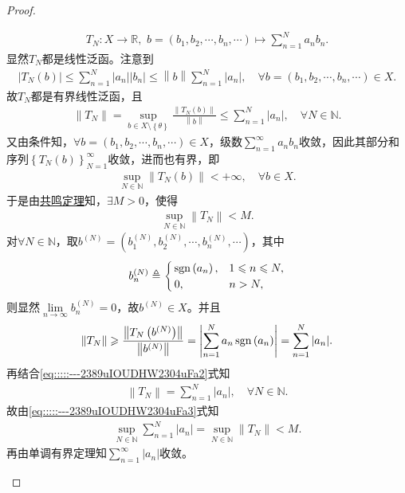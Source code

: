 \documentclass[../../main.tex]{subfiles}%
\begin{document}
\begin{proof}
\begin{enumerate}[(1)]
\begin{align*}
T_N:X\rightarrow \mathbb{R} ,\,\,b=\left( b_1,b_2,\cdots ,b_n,\cdots \right) \mapsto \sum\limits_{n=1}^N{a_n b_n}.
\end{align*}
显然$T_N$都是线性泛函。注意到
\begin{align*}
\left| T_N\left( b \right) \right|\leqslant \sum\limits_{n=1}^N{\left| a_n \right|\left| b_n \right|}\leqslant \left\| b \right\| \sum\limits_{n=1}^N{\left| a_n \right|},\quad \forall b=\left( b_1,b_2,\cdots ,b_n,\cdots \right) \in X.
\end{align*}
故$T_N$都是有界线性泛函，且
\begin{align}
\left\| T_N \right\| =\sup\limits_{b\in X\setminus \left\{ \theta \right\}}\frac{\left\| T_N\left( b \right) \right\|}{\left\| b \right\|}\leqslant \sum\limits_{n=1}^N{\left| a_n \right|},\quad \forall N\in \mathbb{N}.
\label{eq:::::---2389uIOUDHW2304uFa2}
\end{align}
又由条件知，$\forall b=\left( b_1,b_2,\cdots ,b_n,\cdots \right) \in X$，级数$\sum\limits_{n=1}^{\infty}{a_n b_n}$收敛，因此其部分和序列$\left\{ T_N\left( b \right) \right\}_{N=1}^{\infty}$收敛，进而也有界，即
\begin{align*}
\sup\limits_{N\in \mathbb{N}}\left\| T_N\left( b \right) \right\| <+\infty ,\quad \forall b\in X.
\end{align*}
于是由\hyperref[Functional-Analysis-theorem:泛函分析--共鸣定理]{共鸣定理}知，$\exists M>0$，使得
\begin{align}
\sup\limits_{N\in \mathbb{N}}\left\| T_N \right\| <M.
\label{eq:::::---2389uIOUDHW2304uFa3}
\end{align}
对$\forall N\in \mathbb{N}$，取$b^{\left( N \right)}=\left( b_{1}^{\left( N \right)},b_{2}^{\left( N \right)},\cdots ,b_{n}^{\left( N \right)},\cdots \right)$，其中
\begin{align*}
b_{n}^{\left( N \right)}\triangleq
\begin{cases}
\operatorname{sgn} \left( a_n \right) ,&1\leqslant n\leqslant N,\\
0,&n>N,
\end{cases}
\end{align*}
则显然$\lim\limits_{n\rightarrow \infty}b_{n}^{\left( N \right)}=0$，故$b^{\left( N \right)}\in X$。并且
\begin{align*}
\left\| T_N \right\| \geqslant \frac{\left\| T_N\left( b^{\left( N \right)} \right) \right\|}{\left\| b^{\left( N \right)} \right\|}=\left| \sum\limits_{n=1}^N{a_n \operatorname{sgn} \left( a_n \right)} \right|=\sum\limits_{n=1}^N{\left| a_n \right|}.
\end{align*}
再结合\eqref{eq:::::---2389uIOUDHW2304uFa2}式知
\begin{align*}
\left\| T_N \right\| =\sum\limits_{n=1}^N{\left| a_n \right|},\quad \forall N\in \mathbb{N}.
\end{align*}
故由\eqref{eq:::::---2389uIOUDHW2304uFa3}式知
\begin{align*}
\sup\limits_{N\in \mathbb{N}}\sum\limits_{n=1}^N{\left| a_n \right|}=\sup\limits_{N\in \mathbb{N}}\left\| T_N \right\| <M.
\end{align*}
再由单调有界定理知$\sum\limits_{n=1}^{\infty}{\left| a_n \right|}$收敛。


\end{enumerate}
\end{proof}
\end{document}
